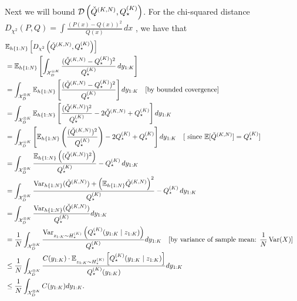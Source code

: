 Next we will bound $\mathcal{D}\left(\check{Q}^{(K,N)},Q^{(K)}_{\star}\right)$. 
For the chi-squared distance $D_{\chi^2}(P,Q) = \int \frac{(P(x) - Q(x))^2}{Q(x)} \, dx$ \citep{cover2006elements}, we have that
\begin{align}
\lefteqn{\mathbb{E}_{h\{1:N\}} \left[ D_{\chi^2}\left( \check{Q}^{(K,N)}, Q^{(K)}_{\star} \right) \right]} \\
&= \mathbb{E}_{h\{1:N\}} \left[ \int_{\mathcal{X}^{\otimes K}_{D}} \frac{(\check{Q}^{(K,N)} - Q^{(K)}_{\star})^2}{Q^{(K)}_{\star}} \, d y_{1:K} \right] \\
%
&= \int_{\mathcal{X}^{\otimes K}_{D}} \mathbb{E}_{h\{1:N\}} \left[ \frac{(\check{Q}^{(K,N)} - Q^{(K)}_{\star})^2}{Q^{(K)}_{\star}} \right] d y_{1:K} 
\quad \text{[by bounded covergence]}\\
%
&= \int_{\mathcal{X}^{\otimes K}_{D}} \mathbb{E}_{h\{1:N\}} \left[ \frac{(\check{Q}^{(K,N)})^2}{Q^{(K)}_{\star}} - 2\check{Q}^{(K,N)} + Q^{(K)}_{\star} \right] d y_{1:K} \\
%
&= \int_{\mathcal{X}^{\otimes K}_{D}} \left[ \mathbb{E}_{h\{1:N\}} \left( \frac{(\check{Q}^{(K,N)})^2}{Q^{(K)}_{\star}} \right)
- 2Q^{(K)}_{\star} + Q^{(K)}_{\star} \right] d y_{1:K}
\quad \text{[ since } \mathbb{E}[\check{Q}^{(K,N)}] = Q^{(K)}_{\star} \text{]}\\
%
&= \int_{\mathcal{X}^{\otimes K}_{D}} \frac{ \mathbb{E}_{h\{1:N\}} \left( (\check{Q}^{(K,N)})^2 \right) }{Q^{(K)}_{\star}} - Q^{(K)}_{\star}\, d y_{1:K} \\
%
&= \int_{\mathcal{X}^{\otimes K}_{D}} \frac{ \operatorname{Var}_{h\{1:N\}}(\check{Q}^{(K,N)}) + \left( \mathbb{E}_{h\{1:N\}} \check{Q}^{(K,N)} \right)^2 }{Q^{(K)}_{\star}}- Q^{(K)}_{\star} \, d y_{1:K} \\
%
&= \int_{\mathcal{X}^{\otimes K}_{D}} \frac{ \operatorname{Var}_{h\{1:N\}}(\check{Q}^{(K,N)}) }{ Q^{(K)}_{\star} } d y_{1:K}\\
%
&= \frac{1}{N} \int_{\mathcal{X}^{\otimes K}_{D}} \frac{ \Var_{z_{1:K}\sim H^{(K)}_{\star}}\lrp{Q^{(K)}_{\star}({y}_{1:K}\mid z_{1:K})}}
{ Q^{(K)}_{\star} } d y_{1:K}
\quad \text{[by variance of sample mean: } \frac{1}{N} \operatorname{Var}(X) \text{]}\\
&\leq\frac{1}{N}\int_{\mathcal{X}^{\otimes K}_{D}}\frac
{C({y}_{1:K})\cdot\mathbb{E}_{z_{1:K}\sim H^{(K)}_{\star}}\lrb{Q^{(K)}_{\star}({y}_{1:K}\mid z_{1:K})}}
{Q^{(K)}_{\star}({y}_{1:K})}d{y}_{1:K} \\
&\leq\frac{1}{N}\int_{\mathcal{X}^{\otimes K}_{D}} C({y}_{1:K}) d{y}_{1:K}.
\end{align}
